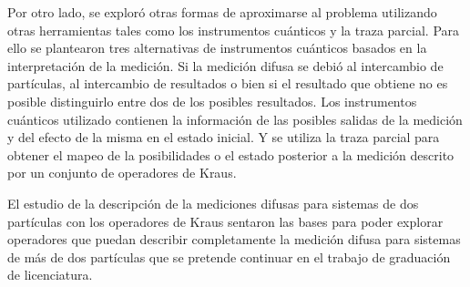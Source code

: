 Por otro lado, se exploró otras formas de aproximarse al problema utilizando otras herramientas tales como los instrumentos cuánticos y la traza parcial. Para ello se plantearon tres alternativas de instrumentos cuánticos basados en la interpretación de la medición. Si la medición difusa se debió al intercambio de partículas, al intercambio de resultados o bien si el resultado que obtiene no es posible distinguirlo entre dos de los posibles resultados. Los instrumentos cuánticos utilizado contienen la información de las posibles salidas de la medición  y del efecto de la misma en el estado inicial. Y se utiliza la traza parcial para obtener el mapeo de la posibilidades o el estado posterior a la medición descrito por un conjunto de operadores de Kraus.

El estudio de la descripción de la mediciones difusas para sistemas de dos partículas con los operadores de Kraus sentaron las bases para poder explorar operadores que puedan describir completamente la medición difusa para sistemas de más de dos partículas que se pretende continuar en el trabajo de graduación de licenciatura.
